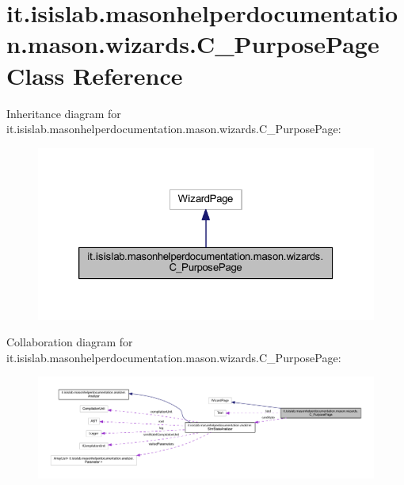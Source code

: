 \hypertarget{classit_1_1isislab_1_1masonhelperdocumentation_1_1mason_1_1wizards_1_1_c___purpose_page}{\section{it.\-isislab.\-masonhelperdocumentation.\-mason.\-wizards.\-C\-\_\-\-Purpose\-Page Class Reference}
\label{classit_1_1isislab_1_1masonhelperdocumentation_1_1mason_1_1wizards_1_1_c___purpose_page}
}


Inheritance diagram for it.\-isislab.\-masonhelperdocumentation.\-mason.\-wizards.\-C\-\_\-\-Purpose\-Page\-:
\nopagebreak
\begin{figure}[H]
\begin{center}
\leavevmode
\includegraphics[width=326pt]{classit_1_1isislab_1_1masonhelperdocumentation_1_1mason_1_1wizards_1_1_c___purpose_page__inherit__graph}
\end{center}
\end{figure}


Collaboration diagram for it.\-isislab.\-masonhelperdocumentation.\-mason.\-wizards.\-C\-\_\-\-Purpose\-Page\-:
\nopagebreak
\begin{figure}[H]
\begin{center}
\leavevmode
\includegraphics[width=350pt]{classit_1_1isislab_1_1masonhelperdocumentation_1_1mason_1_1wizards_1_1_c___purpose_page__coll__graph}
\end{center}
\end{figure}
